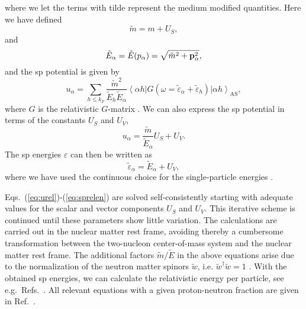 where we let the terms with tilde
represent the medium modified quantities.
Here we have defined \cite{bm90,sw86}
\begin{equation}
   \tilde{m}=m+U_S,
\end{equation}
and
\begin{equation}
      \tilde{E}_{\alpha}=
      \tilde{E}(p_{\alpha})=\sqrt{\tilde{m}^2+{\bf p}_{\alpha}^2},
\end{equation}
and the sp potential is given by
\begin{equation}
   u_{\alpha} =\sum_{h\leq k_F} \frac{\tilde{m}^2}{\tilde{E}_h
	       \tilde{E}_{\alpha}}
	\left\langle  \alpha h \right|
         G(\omega =\tilde{\varepsilon}_{\alpha}
	+\tilde{\varepsilon}_h) \left| 
         \alpha h \right\rangle_{\mathrm{AS}},
	\label{eq:urel}
\end{equation}
where $G$ is the relativistic $G$-matrix \cite{bm90}.
We can also express the sp potential in terms of the constants $U_S$ and
$U_V$,
\begin{equation}
   u_{\alpha} = \frac{\tilde{m}}{\tilde{E}_{\alpha}}U_S +U_V.
   \label{eq:sppotrel}
\end{equation}
The sp energies $\varepsilon$ can then be written as
\begin{equation}
   \tilde{\varepsilon}_{\alpha}=\tilde{E}_{\alpha} +U_V,
   \label{eq:sprelen}
\end{equation}
where we have used the continuous choice for the
single-particle energies \cite{ms89}.

Eqs.\ (\ref{eq:urel})-(\ref{eq:sprelen}) are solved self-consistently
starting
with adequate values for the scalar and vector components
$U_S$ and $U_V$. This iterative scheme is continued until these
parameters show little variation. The calculations are carried out in the
nuclear matter rest frame, avoiding thereby a cumbersome
transformation between the two-nucleon center-of-mass system
and the nuclear matter rest frame. The additional factors
$\tilde{m}/\tilde{E}$ in the above equations
arise due to the normalization of the
neutron matter spinors $\tilde{w}$, i.e.
$\tilde{w}^{\dagger}\tilde{w}=1$ \cite{bm90}. With the obtained sp energies,
we can calculate the relativistic energy per particle, see e.g.\ Refs.\
\cite{bm90,behoo94}. All relevant equations with a given proton-neutron
fraction are given in Ref.\ \cite{swk92}.

